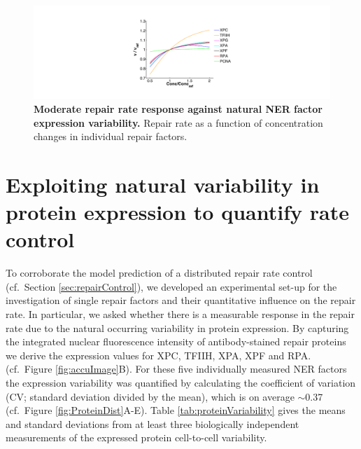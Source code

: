 \begin{figure}[htbp]
	\begin{center}
		\includegraphics[width=1\textwidth]{Abbildungen/figure3_1_b.pdf}
		\caption{\textbf{Moderate repair rate response against natural NER factor expression variability.} Repair rate as a function of concentration changes in individual repair factors.}
		\label{fig:R_largeProteinVariation}
	\end{center}
\end{figure}

\section{Exploiting natural variability in protein expression to quantify rate control}
\label{natural_Variability_m}
To corroborate the model prediction of a distributed repair rate control (cf.\ Section \ref{sec:repairControl}), we developed an experimental set-up for the investigation of single repair factors and their quantitative influence on the repair rate. In particular, we asked whether there is a measurable response in the repair rate due to the natural occurring variability in protein expression. By capturing the integrated nuclear fluorescence intensity of antibody-stained repair proteins we derive the expression values for XPC, TFIIH, XPA, XPF and RPA. (cf.\ Figure \ref{fig:accuImage}B). For these five individually measured NER factors the expression variability was quantified by calculating the coefficient of variation (CV; standard deviation divided by the mean), which is on average $\sim$0.37 (cf.\ Figure \ref{fig:ProteinDist}A-E). Table \ref{tab:proteinVariability} gives the means and standard deviations from at least three biologically independent measurements of the expressed protein cell-to-cell variability.

